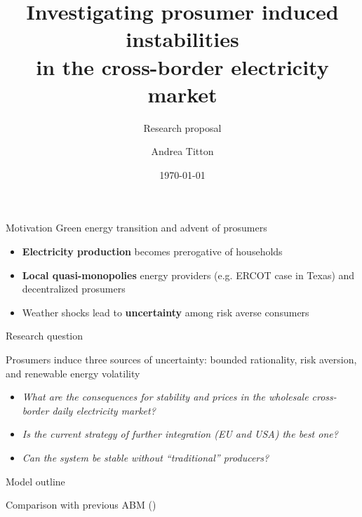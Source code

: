 \documentclass[xcolor={svgnames}]{beamer}
\title[Prosumer Electricity Market]{Investigating prosumer induced instabilities \\ in the cross-border electricity market}
\subtitle{Research proposal}
\author{Andrea Titton}
\institute{Tinbergen Institute}
\date{\today}
\begin{document}
\frame{\titlepage}

\begin{frame}{Motivation}
    Green energy transition and advent of prosumers
    \vspace{2em}
    \begin{itemize}\setlength\itemsep{1.5em}
        \item \textbf{Electricity production} becomes prerogative of households
        \item \textbf{Local quasi-monopolies} energy providers (e.g. ERCOT case in Texas) and decentralized prosumers
        \item Weather shocks lead to \textbf{uncertainty} among risk averse consumers
    \end{itemize}
\end{frame}

\begin{frame}{Research question}

    Prosumers induce three sources of uncertainty: bounded rationality, risk aversion, and renewable energy volatility

    \begin{itemize} \setlength{\itemsep}{1em}
        \item \textit{What are the consequences for stability and prices in the wholesale cross-border daily electricity market?}
        \item \textit{Is the current strategy of further integration (EU and USA) the best one?}
        \item \textit{Can the system be stable without ``traditional'' producers?}
    \end{itemize}

\end{frame}

\begin{frame}{Model outline}

    Comparison with previous ABM (\cite{Weidlich2008})
    \vfill

    \begin{minipage}{0.4\textwidth}
        \resizebox{\textwidth}{!}{}
    \end{minipage}
    \hfill
    \begin{minipage}{0.55\textwidth}
        \resizebox{\textwidth}{!}{}
    \end{minipage}
\end{frame}
\end{document}
